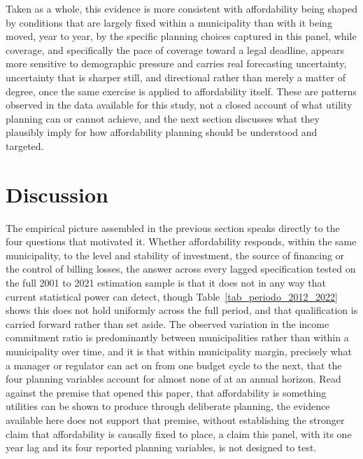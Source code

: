 \documentclass[pdflatex,sn-mathphys-num]{sn-jnl}%
\theoremstyle{thmstyleone}%
\theoremstyle{thmstyletwo}%
\theoremstyle{thmstylethree}%
\begin{document}
Taken as a whole, this evidence is more consistent with affordability being shaped by conditions that are largely fixed within a municipality than with it being moved, year to year, by the specific planning choices captured in this panel, while coverage, and specifically the pace of coverage toward a legal deadline, appears more sensitive to demographic pressure and carries real forecasting uncertainty, uncertainty that is sharper still, and directional rather than merely a matter of degree, once the same exercise is applied to affordability itself. These are patterns observed in the data available for this study, not a closed account of what utility planning can or cannot achieve, and the next section discusses what they plausibly imply for how affordability planning should be understood and targeted.

\section{Discussion}\label{sec12}

The empirical picture assembled in the previous section speaks directly to the four questions that motivated it. Whether affordability responds, within the same municipality, to the level and stability of investment, the source of financing or the control of billing losses, the answer across every lagged specification tested on the full 2001 to 2021 estimation sample is that it does not in any way that current statistical power can detect, though Table~\ref{tab_periodo_2012_2022} shows this does not hold uniformly across the full period, and that qualification is carried forward rather than set aside. The observed variation in the income commitment ratio is predominantly between municipalities rather than within a municipality over time, and it is that within municipality margin, precisely what a manager or regulator can act on from one budget cycle to the next, that the four planning variables account for almost none of at an annual horizon. Read against the premise that opened this paper, that affordability is something utilities can be shown to produce through deliberate planning, the evidence available here does not support that premise, without establishing the stronger claim that affordability is causally fixed to place, a claim this panel, with its one year lag and its four reported planning variables, is not designed to test.
\end{document}
